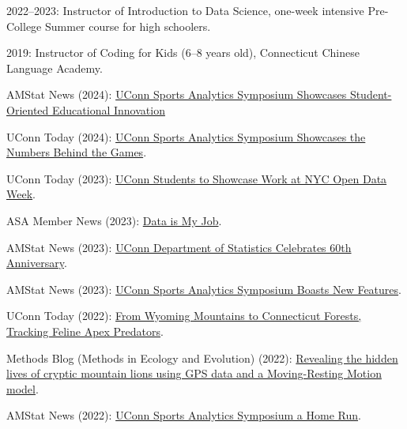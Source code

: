 \documentclass[Statistics]{vita}
\begin{document}
\begin{vita}
\begin{Services}
\begin{Outreaches}
  \item 2022--2023: Instructor of Introduction to Data Science, one-week intensive Pre-College Summer course for high schoolers.
  \item 2019: Instructor of Coding for Kids (6--8 years old), Connecticut  Chinese Language Academy.
  \end{Outreaches}
  \begin{Media}
  \item AMStat News (2024): \href{https://magazine.amstat.org/blog/2024/11/05/uconn-ucsas-2024/}{UConn Sports Analytics Symposium Showcases Student-Oriented Educational Innovation}
  \item UConn Today (2024): \href{https://today.uconn.edu/2024/04/uconn-sports-analytics-symposium-returns-for-fifth-time/}{UConn Sports Analytics Symposium Showcases the Numbers Behind the Games}.
  \item UConn Today (2023): \href{https://today.uconn.edu/2023/03/uconn-students-to-showcase-work-at-nyc-open-data-week/}{UConn Students to Showcase Work at NYC Open Data Week}.
  \item ASA Member News (2023): \href{https://www.amstat.org/docs/default-source/amstat-documents/data-is-my-job-poster.pdf}{Data is My Job}.
  \item AMStat News (2023): \href{https://magazine.amstat.org/blog/2023/02/01/uconn-stats-dept-anniversary/}{UConn Department of Statistics Celebrates 60th Anniversary}.
  \item AMStat News (2023): \href{https://magazine.amstat.org/blog/2023/01/02/uconn-sports-analytics-symposium/}{UConn Sports Analytics Symposium Boasts New Features}.
  \item UConn Today (2022): \href{https://today.uconn.edu/2022/10/from-wyoming-mountains-to-connecticut-forests-tracking-feline-apex-predators/}{From Wyoming Mountains to Connecticut Forests, Tracking Feline Apex Predators}.
  \item Methods Blog (Methods in Ecology and Evolution) (2022): \href{https://methodsblog.com/2022/01/21/revealing-the-hidden-lives-of-cryptic-mountain-lions-using-gps-data-and-a-moving-resting-motion-model/}{Revealing the hidden lives of cryptic mountain lions using GPS data and a Moving-Resting Motion model}.
  \item AMStat News (2022): \href{https://magazine.amstat.org/blog/2022/01/01/uconn-sports-analytics/}{UConn Sports Analytics Symposium a Home Run}.

\end{Media}
\end{Services}
\end{vita}
\end{document}
